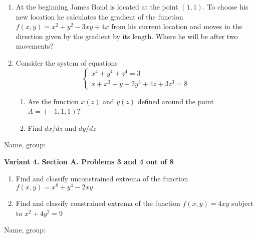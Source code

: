 \documentclass[12pt,a4paper]{article}
\begin{document}
\begin{enumerate}

\item At the beginning James Bond is located at the point $(1, 1)$. To choose his new location he calculates the gradient of the function $f(x,y)=x^2+y^2 - 3xy+4x$ from his current location and moves in the direction given by the gradient by its length. Where he will be after two movements?

\item Consider the system of equations
\[
\begin{cases}
x^4 + y^4 + z^4 = 3 \\
x + x^3 + y + 2y^3 + 4z + 3z^3 = 8
\end{cases}
\]

\begin{enumerate}
\item Are the function $x(z)$ and $y(z)$ defined around the point $A=(-1,1,1)$?
\item Find $dx/dz$ and $dy/dz$
\end{enumerate}

\end{enumerate}

\begin{framed}
\begin{minipage}{42em}
Name, group:\vspace*{3ex}\par 
\noindent\dotfill
\end{minipage}
\end{framed}


\newpage
\textbf{Variant 4. Section A. Problems 3 and 4 out of 8}


\begin{enumerate}[resume]


\item Find and classify unconstrained extrema of the function $f(x,y)=x^8 + y^4 - 2xy$

\item Find and classify constrained extrema of the function $f(x, y) =  4xy$ subject to $x^2 + 4y^2= 9$

\end{enumerate}

\begin{framed}
\begin{minipage}{42em}
Name, group:\vspace*{3ex}\par 
\noindent\dotfill
\end{minipage}
\end{framed}
\end{document}
